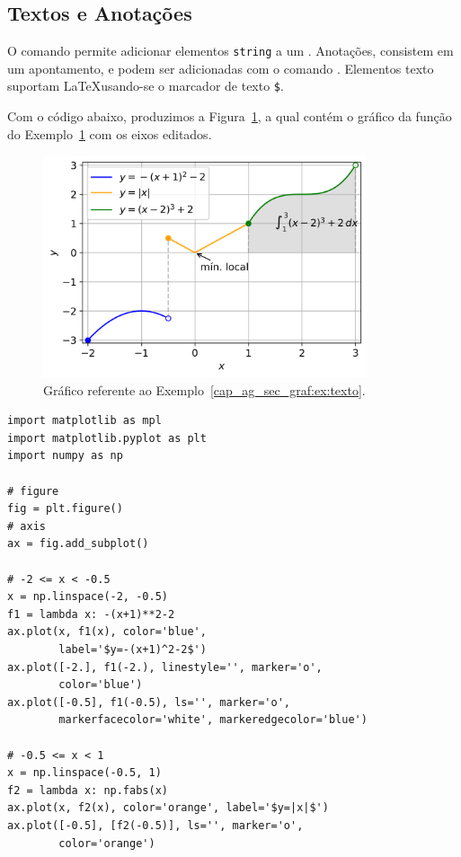 \subsection{Textos e Anotações}

O comando {\PYTHONmatplotlibDOTaxesDOTAxesDOTtext} permite adicionar elementos \texttt{string} a um {\PYTHONmatplotlibDOTaxesDOTAxes}. Anotações, consistem em um apontamento, e podem ser adicionadas com o comando {\PYTHONmatplotlibDOTaxesDOTAxesDOTannotate}. Elementos texto suportam \LaTeX usando-se o marcador de texto \lstinline!$!.%

\begin{ex}\label{cap_ag_sec_graf:ex:texto}
  Com o código abaixo, produzimos a Figura~\ref{cap_ag_sec_graf:fig:texto}, a qual contém o gráfico da função do Exemplo~\ref{cap_ag_sec_graf:fig:texto} com os eixos editados.

  \begin{figure}[H]
    \centering
    \includegraphics[width=3.75in]{./cap_ag/dados/fig_texto/fig.png}
    \caption{Gráfico referente ao Exemplo~\ref{cap_ag_sec_graf:ex:texto}.}
    \label{cap_ag_sec_graf:fig:texto}
  \end{figure}
  
\begin{lstlisting}
import matplotlib as mpl
import matplotlib.pyplot as plt
import numpy as np

# figure
fig = plt.figure()
# axis
ax = fig.add_subplot()

# -2 <= x < -0.5
x = np.linspace(-2, -0.5)
f1 = lambda x: -(x+1)**2-2
ax.plot(x, f1(x), color='blue',
        label='$y=-(x+1)^2-2$')
ax.plot([-2.], f1(-2.), linestyle='', marker='o',
        color='blue')
ax.plot([-0.5], f1(-0.5), ls='', marker='o',
        markerfacecolor='white', markeredgecolor='blue')

# -0.5 <= x < 1
x = np.linspace(-0.5, 1)
f2 = lambda x: np.fabs(x)
ax.plot(x, f2(x), color='orange', label='$y=|x|$')
ax.plot([-0.5], [f2(-0.5)], ls='', marker='o',
        color='orange')


\end{lstlisting}
\end{ex}
